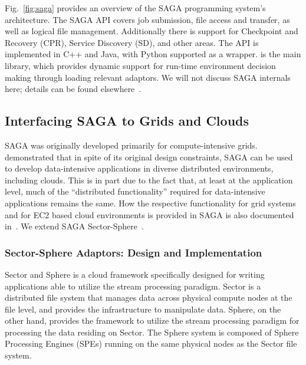 \documentclass[3p,twocolumn]{elsarticle}
\begin{document}
Fig.~\ref{fig:saga} provides an overview of the SAGA programming
system's architecture.  The SAGA API covers job submission, file
access and transfer, as well as logical file management.  Additionally
there is support for Checkpoint and Recovery (CPR), Service Discovery
(SD), and other areas.  The API is implemented in C++ and Java, with
Python supported as a wrapper.  is the main library,
which provides dynamic support for run-time environment decision
making through loading relevant adaptors. We will not discuss SAGA
internals here; details can be found elsewhere~\cite{saga_url,Kaiser:2006qp}.


\subsection{Interfacing SAGA to Grids and Clouds}

SAGA was originally developed primarily for compute-intensive grids.
\cite{saga_ccgrid09} demonstrated that in spite of its original
design constraints, SAGA can be used to develop data-intensive
applications in diverse distributed environments, including clouds.
This is in part due to the fact that, at least at the application level,
much of the ``distributed functionality'' required for data-intensive
applications remains the same.  How the respective functionality for
grid systems and for EC2 based cloud environments is provided in SAGA
is also documented in~\cite{saga_ccgrid09}.  We extend SAGA
Sector-Sphere~\cite{sectorsphere09}. 






\subsubsection{Sector-Sphere Adaptors: Design and Implementation}

Sector and Sphere is a cloud framework specifically designed for
writing applications able to utilize the stream processing paradigm.
Sector is a distributed file system that manages data across physical
compute nodes at the file level, and provides the infrastructure to
manipulate data.  Sphere, on the other hand, provides the
framework to utilize the stream processing paradigm for processing the
data residing on Sector.  The Sphere system is composed of Sphere
Processing Engines (SPEs) running on the same physical nodes as the
Sector file system.
\end{document}
